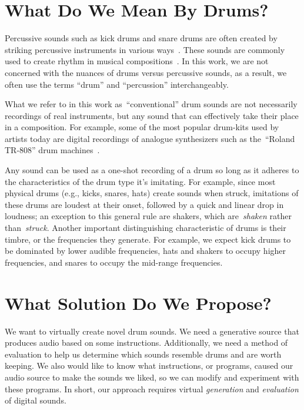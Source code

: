 \documentclass[\main/thesis.tex]{subfiles}
\begin{document}
 \section{What Do We Mean By Drums?}
 Percussive sounds such as kick drums and snare drums are often created by striking percussive instruments in various ways~\cite{barry2005drum}. These sounds are commonly used to create rhythm in musical compositions~\cite{needham1967percussion}. In this work, we are not concerned with the nuances of drums versus percussive sounds, as a result, we often use the terms \enquote{drum} and \enquote{percussion} interchangeably.
 
 What we refer to in this work as~\enquote{conventional} drum sounds are not necessarily recordings of real instruments, but any sound that can effectively take their place in a composition. For example, some of the most popular drum-kits used by artists today are digital recordings of  analogue synthesizers such as the~\enquote{Roland TR-808} drum machines~\cite{mellor1993hands,hoffmann2004drum}. 
 
 Any sound can be used as a one-shot recording of a drum so long as it adheres to the characteristics of the drum type it's imitating. For example, since most physical drums (e.g., kicks, snares, hats) create sounds when struck, imitations of these drums are loudest at their onset, followed by a quick and linear drop in loudness; an exception to this general rule are shakers, which are~\textit{shaken} rather than~\textit{struck}. Another important distinguishing characteristic of drums is their timbre, or the frequencies they generate. For example, we expect kick drums to be dominated by lower audible frequencies, hats and shakers to occupy higher frequencies, and snares to occupy the mid-range frequencies. 
 

\section{What Solution Do We Propose?}
\label{sec:sol_propose}
We want to virtually create novel drum sounds. We need a generative source that produces audio based on some instructions. Additionally, we need a method of evaluation to help us determine which sounds resemble drums and are worth keeping. We also would like to know what instructions, or programs, caused our audio source to make the sounds we liked, so we can modify and experiment with these programs. In short, our approach requires virtual \textit{generation} and \textit{evaluation} of digital sounds.   
\end{document}
